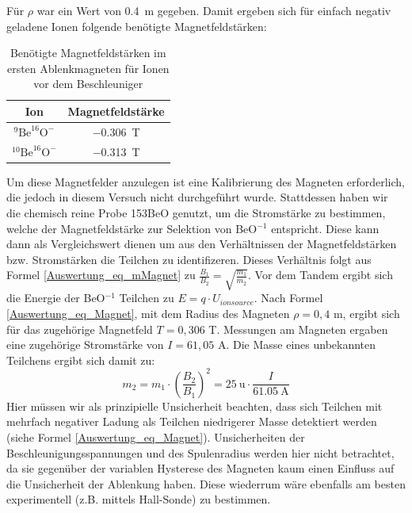 Für $\rho$ war ein Wert von \SI{0.4}{\metre} gegeben.
Damit ergeben sich für einfach negativ geladene Ionen folgende benötigte Magnetfeldstärken:
\begin{table}[h]
  \centering
  \begin{tabular}{|c|c|}
    \hline
    Ion & Magnetfeldstärke \\
    \hline
    $^{9}\text{Be}^{16}\text{O}^{-}$ & \SI{-0.306}{\tesla} \\
    \hline
    $^{10}\text{Be}^{16}\text{O}^{-}$ & \SI{-0.313}{\tesla} \\
    \hline
  \end{tabular}
  \caption{Benötigte Magnetfeldstärken im ersten Ablenkmagneten für Ionen vor dem Beschleuniger}
  \label{Auswertung_tab_Ionenenergien_vor_Besch}
\end{table}
Um diese Magnetfelder anzulegen ist eine Kalibrierung des Magneten erforderlich, die jedoch in diesem Versuch nicht durchgeführt wurde.
Stattdessen haben wir die chemisch reine Probe 153BeO genutzt, um die Stromstärke zu bestimmen, welche der Magnetfeldstärke zur Selektion von BeO$^{-1}$ entspricht.
Diese kann dann als Vergleichswert dienen um aus den Verhältnissen der Magnetfeldstärken bzw. Stromstärken die Teilchen zu identifizeren.
Dieses Verhältnis folgt aus Formel \ref{Auswertung_eq_mMagnet} zu $\frac{B_1}{B_2} = \sqrt{\frac{m_1}{m_2}}$.
Vor dem Tandem ergibt sich die Energie der BeO$^{-1}$ Teilchen zu $E = q \cdot U_{ionsource}$.
Nach Formel \ref{Auswertung_eq_Magnet}, mit dem Radius des Magneten $\rho = 0,4$ m, ergibt sich für das zugehörige Magnetfeld $T = 0,306$ T.
Messungen am Magneten ergaben eine zugehörige Stromstärke von $I = 61,05$ A.
Die Masse eines unbekannten Teilchens ergibt sich damit zu:
\begin{equation}
    m_2 = m_1 \cdot \left( \frac{B_2}{B_1} \right)^2 = 25 \: \text{u} \cdot \frac{I}{61.05 \: \text{A}}
    \label{LE_masse}
\end{equation}
Hier müssen wir als prinzipielle Unsicherheit beachten, dass sich Teilchen mit mehrfach negativer Ladung als Teilchen niedrigerer Masse detektiert werden (siehe Formel \ref{Auswertung_eq_Magnet}).
Unsicherheiten der Beschleunigungsspannungen und des Spulenradius werden hier nicht betrachtet, da sie gegenüber der variablen Hysterese des Magneten kaum einen Einfluss auf die Unsicherheit der Ablenkung haben.
Diese wiederrum wäre ebenfalls am besten experimentell (z.B. mittels Hall-Sonde) zu bestimmen.

